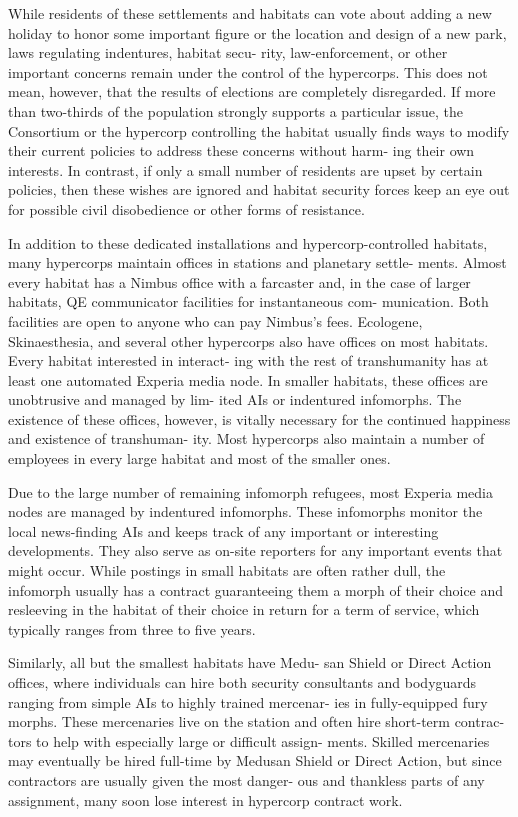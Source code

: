 While residents of these settlements and habitats 
can vote about adding a new holiday to honor some 
important figure or the location and design of a 
new park, laws regulating indentures, habitat secu-
rity, law-enforcement, or other important concerns 
remain under the control of the hypercorps. This 
does not mean, however, that the results of elections 
are completely disregarded. If more than two-thirds 
of the population strongly supports a particular 
issue, the Consortium or the hypercorp controlling 
the habitat usually finds ways to modify their current 
policies to address these concerns without harm-
ing their own interests. In contrast, if only a small 
number of residents are upset by certain policies, 
then these wishes are ignored and habitat security 
forces keep an eye out for possible civil disobedience 
or other forms of resistance.

In addition to these dedicated installations and 
hypercorp-controlled habitats, many hypercorps 
maintain offices in stations and planetary settle-
ments. Almost every habitat has a Nimbus office 
with a farcaster and, in the case of larger habitats, 
QE communicator facilities for instantaneous com-
munication. Both facilities are open to anyone who 
can pay Nimbus's fees. Ecologene, Skinaesthesia, 
and several other hypercorps also have offices on 
most habitats. Every habitat interested in interact-
ing with the rest of transhumanity has at least one 
automated Experia media node. In smaller habitats, 
these offices are unobtrusive and managed by lim-
ited AIs or indentured infomorphs. The existence 
of these offices, however, is vitally necessary for the 
continued happiness and existence of transhuman-
ity. Most hypercorps also maintain a number of 
employees in every large habitat and most of the 
smaller ones.

Due to the large number of remaining infomorph 
refugees, most Experia media nodes are managed by 
indentured infomorphs. These infomorphs monitor 
the local news-finding AIs and keeps track of any 
important or interesting developments. They also 
serve as on-site reporters for any important events 
that might occur. While postings in small habitats 
are often rather dull, the infomorph usually has a 
contract guaranteeing them a morph of their choice 
and resleeving in the habitat of their choice in return 
for a term of service, which typically ranges from 
three to five years.

Similarly, all but the smallest habitats have Medu-
san Shield or Direct Action offices, where individuals 
can hire both security consultants and bodyguards 
ranging from simple AIs to highly trained mercenar-
ies in fully-equipped fury morphs. These mercenaries 
live on the station and often hire short-term contrac-
tors to help with especially large or difficult assign-
ments. Skilled mercenaries may eventually be hired 
full-time by Medusan Shield or Direct Action, but 
since contractors are usually given the most danger-
ous and thankless parts of any assignment, many 
soon lose interest in hypercorp contract work.

